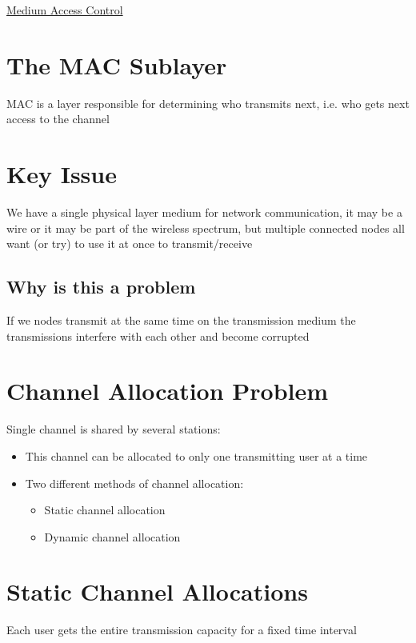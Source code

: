 \documentclass{article}[18pt]
\begin{document}
\begin{center}
\underline{\huge Medium Access Control}
\end{center}
\section{The MAC Sublayer}
MAC is a layer responsible for determining who transmits next, i.e. who gets next access to the channel
\section{Key Issue}
We have a single physical layer medium for network communication, it may be a wire or it may be part of the wireless spectrum, but multiple connected nodes all want (or try) to use it at once to transmit/receive
\subsection{Why is this a problem}
If we nodes transmit at the same time on the transmission medium the transmissions interfere with each other and become corrupted
\section{Channel Allocation Problem}
Single channel is shared by several stations:
\begin{itemize}
	\item This channel can be allocated to only one transmitting user at a time
	\item Two different methods of channel allocation:
	\begin{itemize}
		\item Static channel allocation
		\item Dynamic channel allocation
	\end{itemize}
\end{itemize}
\section{Static Channel Allocations}
\begin{defin}
Each user gets the entire transmission capacity for a fixed time interval
\end{defin}
\end{document}
